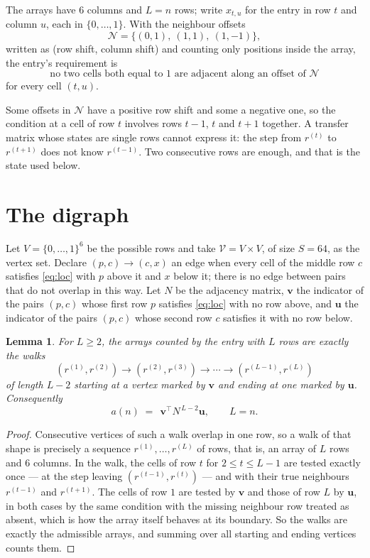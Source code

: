 \documentclass[11pt,a4paper]{article}
\theoremstyle{plain}
\newtheorem{lemma}[theorem]{Lemma}
\theoremstyle{definition}
\begin{document}
The arrays have $6$ columns and $L=n$ rows; write $x_{t,u}$ for the entry in
row $t$ and column $u$, each in $\{0,\dots,1\}$. With the neighbour offsets
\[
\mathcal N=\{(0,1),\ (1,1),\ (1,-1)\},
\]
written as (row shift, column shift) and counting only positions inside the array, the
entry's requirement is
\begin{equation}\label{eq:loc}
\text{no two cells both equal to }1\text{ are adjacent along an offset of }\mathcal N
\end{equation}
for every cell $(t,u)$.

Some offsets in $\mathcal N$ have a positive row shift and some a negative one, so the
condition at a cell of row $t$ involves rows $t-1$, $t$ and $t+1$ together. A transfer
matrix whose states are single rows cannot express it: the step from $r^{(t)}$ to
$r^{(t+1)}$ does not know $r^{(t-1)}$. Two consecutive rows are enough, and that is
the state used below.

\section{The digraph}

Let $V=\{0,\dots,1\}^{6}$ be the possible rows and take
$\mathcal V=V\times V$, of size $S=64$, as the vertex set. Declare $(p,c)\to(c,x)$ an edge
when every cell of the middle row $c$ satisfies \eqref{eq:loc} with $p$ above it and $x$
below it; there is no edge between pairs that do not overlap in this way. Let $N$ be the
adjacency matrix, $\mathbf{v}$ the indicator of the pairs $(p,c)$ whose first row $p$
satisfies \eqref{eq:loc} with no row above, and $\mathbf{u}$ the indicator of
the pairs $(p,c)$ whose second row $c$ satisfies it with no row below.

\begin{lemma}\label{lem:walk}
For $L\ge2$, the arrays counted by the entry with $L$ rows are exactly the walks
\[
(r^{(1)},r^{(2)})\to(r^{(2)},r^{(3)})\to\cdots\to(r^{(L-1)},r^{(L)})
\]
of length $L-2$ starting at a vertex marked by $\mathbf{v}$ and ending at one marked by
$\mathbf{u}$. Consequently
\[
a(n)\;=\;\,\mathbf{v}^{\!\top}N^{\,L-2}\mathbf{u},\qquad L=n .
\]
\end{lemma}

\begin{proof}
Consecutive vertices of such a walk overlap in one row, so a walk of that shape is
precisely a sequence $r^{(1)},\dots,r^{(L)}$ of rows, that is, an array of $L$ rows
and $6$ columns. In the walk, the cells of row $t$ for $2\le t\le L-1$ are tested
exactly once --- at the step leaving $(r^{(t-1)},r^{(t)})$ --- and with their true
neighbours $r^{(t-1)}$ and $r^{(t+1)}$. The cells of row $1$ are tested by
$\mathbf{v}$ and those of row $L$ by $\mathbf{u}$, in both cases by the same condition
with the missing neighbour row treated as absent, which is how the array itself behaves at
its boundary. So the walks are exactly the admissible arrays, and summing over all starting
and ending vertices counts them.
\end{proof}
\end{document}
